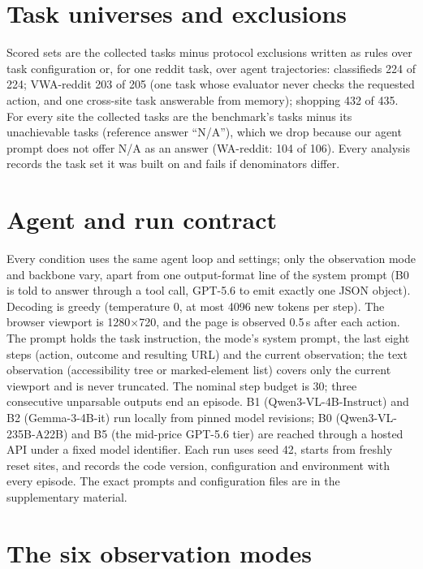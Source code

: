 \section{Task universes and exclusions}\label{app:universe}

Scored sets are the collected tasks minus protocol exclusions written as rules over task configuration or, for one reddit task, over agent trajectories: classifieds 224 of 224; VWA-reddit 203 of 205 (one task whose evaluator never checks the requested action, and one cross-site task answerable from memory); shopping 432 of 435. For every site the collected tasks are the benchmark's tasks minus its unachievable tasks (reference answer ``N/A''), which we drop because our agent prompt does not offer N/A as an answer (WA-reddit: 104 of 106). Every analysis records the task set it was built on and fails if denominators differ.

\section{Agent and run contract}\label{app:contract}

Every condition uses the same agent loop and settings; only the observation mode and backbone vary, apart from one output-format line of the system prompt (B0 is told to answer through a tool call, GPT-5.6 to emit exactly one JSON object). Decoding is greedy (temperature 0, at most 4096 new tokens per step). The browser viewport is 1280$\times$720, and the page is observed 0.5\,s after each action. The prompt holds the task instruction, the mode's system prompt, the last eight steps (action, outcome and resulting URL) and the current observation; the text observation (accessibility tree or marked-element list) covers only the current viewport and is never truncated. The nominal step budget is 30; three consecutive unparsable outputs end an episode. B1 (Qwen3-VL-4B-Instruct) and B2 (Gemma-3-4B-it) run locally from pinned model revisions; B0 (Qwen3-VL-235B-A22B) and B5 (the mid-price GPT-5.6 tier) are reached through a hosted API under a fixed model identifier. Each run uses seed 42, starts from freshly reset sites, and records the code version, configuration and environment with every episode. The exact prompts and configuration files are in the supplementary material.

\section{The six observation modes}\label{app:modes}

